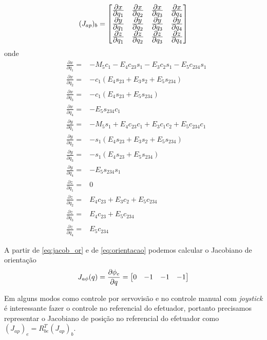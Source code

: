 \begin{equation}
({J}_{ap})_b = 
\begin{bmatrix}
	\frac{\displaystyle \partial x}{\displaystyle \partial q_1} & \frac{\displaystyle \partial x}{\displaystyle \partial q_2} & \frac{\displaystyle \partial x}{\displaystyle \partial q_3} & \frac{\displaystyle \partial x}{\displaystyle \partial q_4}  \\
	\frac{\displaystyle \partial y}{\displaystyle \partial q_1} & \frac{\displaystyle \partial y}{\displaystyle \partial q_2} & \frac{\displaystyle \partial y}{\displaystyle \partial q_3} & \frac{\displaystyle \partial y}{\displaystyle \partial q_4}  \\
	\frac{\displaystyle \partial z}{\displaystyle \partial q_1} & \frac{\displaystyle \partial z}{\displaystyle \partial q_2} & \frac{\displaystyle \partial z}{\displaystyle \partial q_3} & \frac{\displaystyle \partial z}{\displaystyle \partial q_4}  \\
\end{bmatrix}
\end{equation}
onde
\begin{align*}
&\frac{\partial x}{\partial q_1} =& - M_5c_1 - E_4c_{23}s_1 - E_3c_2s_1 - E_5c_{234}s_1  \\
&\frac{\partial x}{\partial q_2} =& -c_1(E_4s_{23}+E_3s_2+E_5s_{234}) \\
&\frac{\partial x}{\partial q_3} =& -c_1(E_4s_{23}+E_5s_{234}) \\
&\frac{\partial x}{\partial q_4} =& -E_5s_{234}c_1 \\
&\frac{\partial y}{\partial q_1} =& -M_5s_1+E_4c_{23}c_1+E_3c_1c_2+E_5c_{234}c_1 \\
&\frac{\partial y}{\partial q_2} =& -s_1(E_4s_{23}+E_3s_2+E_5s_{234}) \\
&\frac{\partial y}{\partial q_3} =& -s_1(E_4s_{23}+E_5s_{234}) \\
&\frac{\partial y}{\partial q_4} =& -E_5s_{234}s_1 \\ 
&\frac{\partial z}{\partial q_1} =& 0 \\ 
&\frac{\partial z}{\partial q_2} =& E_4c_{23}+E_3c_2+E_5c_{234} \\
&\frac{\partial z}{\partial q_3} =& E_4c_{23}+E_5c_{234}\\
&\frac{\partial z}{\partial q_4} =& E_{5}c_{234} 
\end{align*}

A partir de \ref{eq:jacob_or} e de \ref{eq:orientacao} podemos calcular o Jacobiano de orientação
\begin{equation}
{J}_{a\phi}({q}) = \frac{\partial \phi_e}{\partial {q}} = \begin{bmatrix}0 & -1 & -1 & -1\end{bmatrix}
\end{equation}
 
Em alguns modos como controle por servovisão e no controle manual com \textit{joystick} é interessante fazer o controle no referencial do efetuador, portanto precisamos representar o Jacobiano de posição no referencial do efetuador como $({J}_{ap})_e = {R}_{be}^T ({J}_{ap})_b$.  

